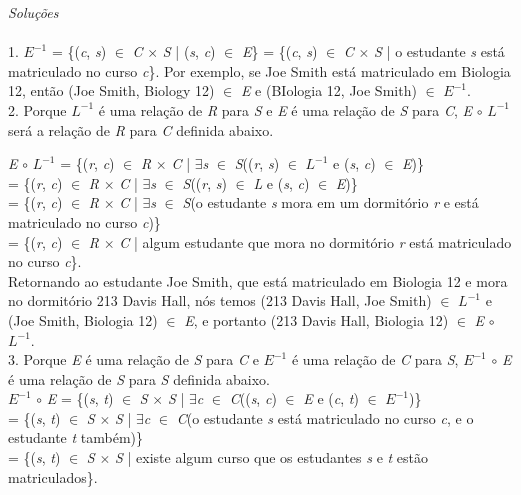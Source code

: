 \textit{Soluções}
\\
\\
1. $\textit{E}^{-1}$ = \{(\textit{c}, \textit{s}) $\in$ \textit{C} $\times$ \textit{S} | (\textit{s}, \textit{c}) $\in$ \textit{E}\} = \{(\textit{c}, \textit{s}) $\in$ \textit{C} $\times$ \textit{S} | o estudante \textit{s} está matriculado no curso \textit{c}\}. Por exemplo, se Joe Smith está matriculado em Biologia 12, então (Joe Smith, Biology 12) $\in$ \textit{E} e (BIologia 12, Joe Smith) $\in$ $\textit{E}^{-1}$.
\\
2. Porque $\textit{L}^{-1}$ é uma relação de \textit{R} para \textit{S} e \textit{E} é uma relação de \textit{S} para \textit{C}, \textit{E} $\circ$ $\textit{L}^{-1}$ será a relação de \textit{R} para \textit{C} definida abaixo.
\begin{center}
\textit{E} $\circ$ $\textit{L}^{-1}$ = \{(\textit{r}, \textit{c}) $\in$ \textit{R} $\times$ \textit{C} | $\exists$\textit{s} $\in$ \textit{S}((\textit{r}, \textit{s}) $\in$ $\textit{L}^{-1}$ e (\textit{s}, \textit{c}) $\in$ \textit{E})\}
\\
= \{(\textit{r}, \textit{c}) $\in$ \textit{R} $\times$ \textit{C} | $\exists$\textit{s} $\in$ \textit{S}((\textit{r}, \textit{s}) $\in$ \textit{L} e (\textit{s}, \textit{c}) $\in$ \textit{E})\}
\\
= \{(\textit{r}, \textit{c}) $\in$ \textit{R} $\times$ \textit{C} | $\exists$\textit{s} $\in$ \textit{S}(o estudante \textit{s} mora em um dormitório \textit{r} e está matriculado no curso \textit{c})\}
\\
= \{(\textit{r}, \textit{c}) $\in$ \textit{R} $\times$ \textit{C} | algum estudante que mora no dormitório \textit{r} está matriculado no curso \textit{c}\}.
\\
Retornando ao estudante Joe Smith, que está matriculado em Biologia 12 e mora no dormitório 213 Davis Hall, nós temos (213 Davis Hall, Joe Smith) $\in$ $\textit{L}^{-1}$ e (Joe Smith, Biologia 12) $\in$ \textit{E}, e portanto (213 Davis Hall, Biologia 12) $\in$ \textit{E} $\circ$ $\textit{L}^{-1}$.
\\
3. Porque \textit{E} é uma relação de \textit{S} para \textit{C} e $\textit{E}^{-1}$ é uma relação de \textit{C} para \textit{S}, $\textit{E}^{-1}$ $\circ$ \textit{E} é uma relação de \textit{S} para \textit{S} definida abaixo.
\\
$\textit{E}^{-1}$ $\circ$ \textit{E} = \{(\textit{s}, \textit{t}) $\in$ \textit{S} $\times$ \textit{S} | $\exists$\textit{c} $\in$ \textit{C}((\textit{s}, \textit{c}) $\in$ \textit{E} e (\textit{c}, \textit{t}) $\in$ $\textit{E}^{-1}$)\}
\\
= \{(\textit{s}, \textit{t}) $\in$ \textit{S} $\times$ \textit{S} | $\exists$\textit{c} $\in$ \textit{C}(o estudante \textit{s} está matriculado no curso \textit{c}, e o estudante \textit{t} também)\}
\\
= \{(\textit{s}, \textit{t}) $\in$ \textit{S} $\times$ \textit{S} | existe algum curso  que os estudantes \textit{s} e \textit{t} estão matriculados\}.
\end{center}
